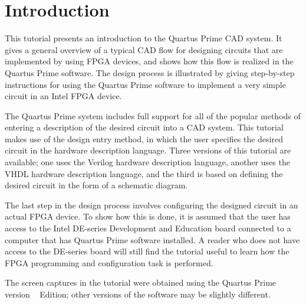 \section{Introduction}


This tutorial presents an introduction to the Quartus\textsuperscript{\textregistered} Prime CAD system.
It gives a general overview of a typical CAD flow for designing circuits that are
implemented by using FPGA devices, and shows how this flow is realized in
the Quartus Prime software. The design process is illustrated by giving step-by-step
instructions for using the Quartus Prime software to implement a very simple circuit
in an Intel\textsuperscript{\textregistered} FPGA device.

The Quartus Prime system includes full support for all of the popular methods of
entering a description of the desired circuit into a CAD system. This tutorial
makes use of the \typeName{} design entry method, in which the user specifies the desired
circuit in the \typeName{} hardware description language. 
Three versions of this tutorial are available; one
uses the Verilog hardware description language, another uses the VHDL hardware description language, and the third is based on defining
the desired circuit in the form of a schematic diagram.

The last step in the design process involves configuring the designed circuit
in an actual FPGA device. To show how this is done, it is assumed that the user has access
to the Intel DE-series Development and Education board connected to 
a computer that has Quartus Prime software installed. 
A reader who does not have access to the DE-series board will still find the tutorial useful
to learn how the FPGA programming and configuration task is performed.

The screen captures in the tutorial were obtained using the 
Quartus Prime version \versnum \ \edition{} Edition; other versions of the software may be slightly different.
